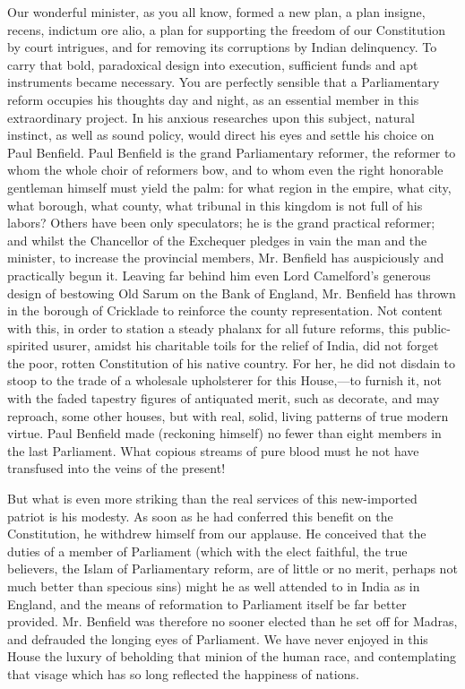 Our wonderful minister, as you all know, formed a new plan, a plan insigne, recens, indictum ore alio, a plan for supporting the freedom of our Constitution by court intrigues, and for removing its corruptions by Indian delinquency. To carry that bold, paradoxical design into execution, sufficient funds and apt instruments became necessary. You are perfectly sensible that a Parliamentary reform occupies his thoughts day and night, as an essential member in this extraordinary project. In his anxious researches upon this subject, natural instinct, as well as sound policy, would direct his eyes and settle his choice on Paul Benfield. Paul Benfield is the grand Parliamentary reformer, the reformer to whom the whole choir of reformers bow, and to whom even the right honorable gentleman himself must yield the palm: for what region in the empire, what city, what borough, what county, what tribunal in this kingdom is not full of his labors? Others have been only speculators; he is the grand practical reformer; and whilst the Chancellor of the Exchequer pledges in vain the man and the minister, to increase the provincial members, Mr. Benfield has auspiciously and practically begun it. Leaving far behind him even Lord Camelford's generous design of bestowing Old Sarum on the Bank of England, Mr. Benfield has thrown in the borough of Cricklade to reinforce the county representation. Not content with this, in order to station a steady phalanx for all future reforms, this public-spirited usurer, amidst his charitable toils for the relief of India, did not forget the poor, rotten Constitution of his native country. For her, he did not disdain to stoop to the trade of a wholesale upholsterer for this House,—to furnish it, not with the faded tapestry figures of antiquated merit, such as decorate, and may reproach, some other houses, but with real, solid, living patterns of true modern virtue. Paul Benfield made (reckoning himself) no fewer than eight members in the last Parliament. What copious streams of pure blood must he not have transfused into the veins of the present!

But what is even more striking than the real services of this new-imported patriot is his modesty. As soon as he had conferred this benefit on the Constitution, he withdrew himself from our applause. He conceived that the duties of a member of Parliament (which with the elect faithful, the true believers, the Islam of Parliamentary reform, are of little or no merit, perhaps not much better than specious sins) might he as well attended to in India as in England, and the means of reformation to Parliament itself be far better provided. Mr. Benfield was therefore no sooner elected than he set off for Madras, and defrauded the longing eyes of Parliament. We have never enjoyed in this House the luxury of beholding that minion of the human race, and contemplating that visage which has so long reflected the happiness of nations.

